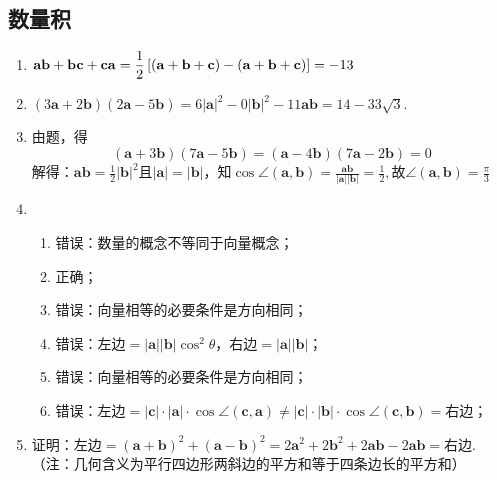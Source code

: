 \documentclass[UTF8]{ctexart}
\begin{document}
\subsection{数量积}
\begin{enumerate}
\item $\mathbf{a}\mathbf{b}+\mathbf{b}\mathbf{c}+\mathbf{c}\mathbf{a}=\displaystyle\displaystyle\frac{1}{2}\left[\left(\mathbf{a}+\mathbf{b}+\mathbf{c}\right)-\left(\mathbf{a}+\mathbf{b}+\mathbf{c}\right)\right]=-13$

\item $\left(3\mathbf{a}+2\mathbf{b}\right)\left(2\mathbf{a}-5\mathbf{b}\right)=6\left|\mathbf{a}\right|^2-0\left|\mathbf{b}\right|^2-11\mathbf{a}\mathbf{b}=14-33\sqrt{3}.$

\item 由题，得$$\left(\mathbf{a}+3\mathbf{b}\right)\left(7\mathbf{a}-5\mathbf{b}\right)=\left(\mathbf{a}-4\mathbf{b}\right)\left(7\mathbf{a}-2\mathbf{b}\right)=0$$解得：$\mathbf{a}\mathbf{b}=\displaystyle\frac{1}{2}\left|\mathbf{b}\right|^2$且$\left|\mathbf{a}\right|=\left|\mathbf{b}\right|$，知$\cos\angle\left(\mathbf{a},\mathbf{b}\right)=\displaystyle\frac{\mathbf{a}\mathbf{b}}{\left|\mathbf{a}\right|\left|\mathbf{b}\right|}=\displaystyle\frac{1}{2},$故$\angle\left(\mathbf{a},\mathbf{b}\right)=\displaystyle\frac{\pi}{3}$

\item \begin{enumerate}[(1)]
\item 错误：数量的概念不等同于向量概念；
\item 正确；
\item 错误：向量相等的必要条件是方向相同；
\item 错误：左边$=\left|\mathbf{a}\right|\left|\mathbf{b}\right|\cos^{2}\theta$，右边$=\left|\mathbf{a}\right|\left|\mathbf{b}\right|$；
\item 错误：向量相等的必要条件是方向相同；
\item 错误：左边$=\left|\mathbf{c}\right|\cdot\left|\mathbf{a}\right|\cdot\cos\angle\left(\mathbf{c},\mathbf{a}\right)\neq\left|\mathbf{c}\right|\cdot\left|\mathbf{b}\right|\cdot \cos\angle\left(\mathbf{c},\mathbf{b}\right)=$右边；
\end{enumerate}
\item 证明：左边$=\left(\mathbf{a}+\mathbf{b}\right)^2+\left(\mathbf{a}-\mathbf{b}\right)^2=2\mathbf{a}^2+2\mathbf{b}^2+2\mathbf{a}\mathbf{b}-2\mathbf{a}\mathbf{b}=$右边.\\
（注：几何含义为平行四边形两斜边的平方和等于四条边长的平方和）


\end{enumerate}
\end{document}
